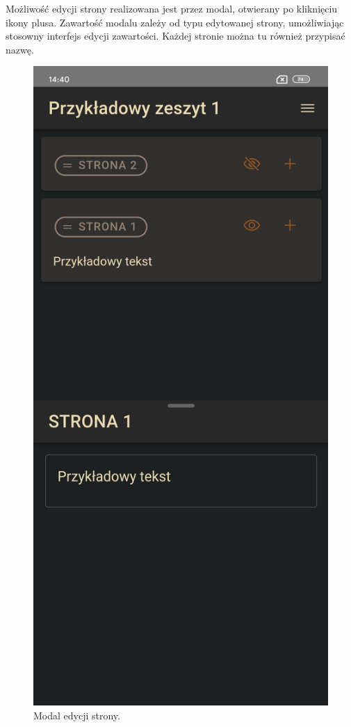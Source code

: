 Możliwość edycji strony realizowana jest przez modal, otwierany po kliknięciu ikony plusa. Zawartość modalu zależy od
typu edytowanej strony, umożliwiając stosowny interfejs edycji zawartości. Każdej stronie można tu również przypisać nazwę.
\begin{figure}[H]
	\begin{center}
		\includegraphics[scale=0.2]{media/EditorModal.jpg}
	\end{center}
	\caption{Modal edycji strony.}
	\label{rys:editor-modal}
\end{figure}

